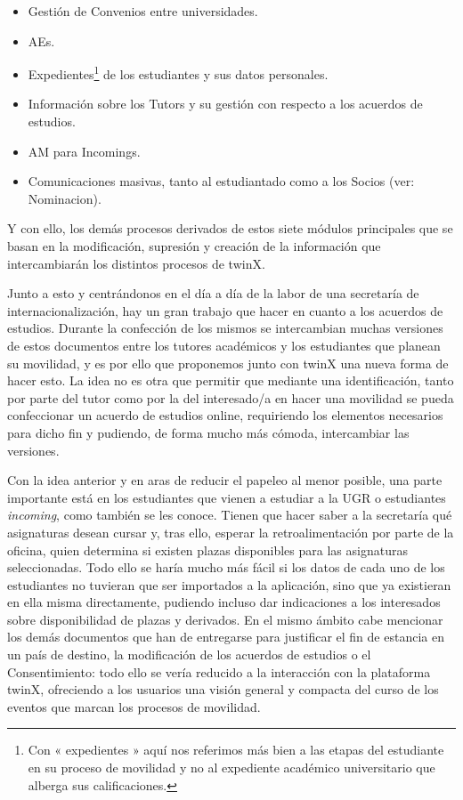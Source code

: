 \begin{itemize}
	\item Gestión de \glspl{Convenio} entre universidades.
	\item \glspl{AE}.
	\item Expedientes\footnote{Con « expedientes » aquí nos referimos más bien a las etapas del estudiante en su proceso de movilidad y no al expediente académico universitario que alberga sus calificaciones.} de los estudiantes y sus datos personales.
	\item Información sobre los \glspl{Tutor} y su gestión con respecto a los acuerdos de estudios.
	\item \gls{AM} para \glspl{Incoming}.
	\item Comunicaciones masivas, tanto al estudiantado como a los \glspl{Socio} (ver: \gls{Nominacion}).
\end{itemize}

Y con ello, los demás procesos derivados de estos siete módulos principales que se basan en la modificación, supresión y creación de la información que intercambiarán los distintos procesos de twinX.

Junto a esto y centrándonos en el día a día de la labor de una secretaría de internacionalización, hay un gran trabajo que hacer en cuanto a los acuerdos de estudios. Durante la confección de los mismos se intercambian muchas versiones de estos documentos entre los tutores académicos y  los estudiantes que planean su movilidad, y es por ello que proponemos junto con twinX una nueva forma de hacer esto. La idea no es otra que permitir que mediante una identificación, tanto por parte del tutor como por la del interesado/a en hacer una movilidad se pueda confeccionar un acuerdo de estudios online, requiriendo los elementos necesarios para dicho fin y pudiendo, de forma mucho más cómoda, intercambiar las versiones.

Con la idea anterior y en aras de reducir el papeleo al menor posible, una parte importante está en los estudiantes que vienen a estudiar a la UGR o estudiantes \textit{incoming}, como también se les conoce. Tienen que hacer saber a la secretaría qué asignaturas desean cursar y, tras ello, esperar la retroalimentación por parte de la oficina, quien determina si existen plazas disponibles para las asignaturas seleccionadas. Todo ello se haría mucho más fácil si los datos de cada uno de los estudiantes no tuvieran que ser importados a la aplicación, sino que ya existieran en ella misma directamente, pudiendo incluso dar indicaciones a los interesados sobre disponibilidad de plazas y derivados. En el mismo ámbito cabe mencionar los demás documentos que han de entregarse para justificar el fin de estancia en un país de destino, la modificación de los acuerdos de estudios o el \gls{Consentimiento}: todo ello se vería reducido a la interacción con la plataforma twinX, ofreciendo a los usuarios una visión general y compacta del curso de los eventos que marcan los procesos de movilidad.

